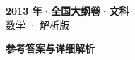 \documentclass[zihao=-4, a4paper]{ctexart}
\begin{document}
\begin{center}
  {\Large\bfseries 2013 年·全国大纲卷·文科}\\[4pt]
  {\large 数学 · 解析版}
\end{center}
\medskip
{}

\clearpage
{}
\begin{center}{\Large\bfseries 参考答案与详细解析}\end{center}
\medskip

\end{document}

